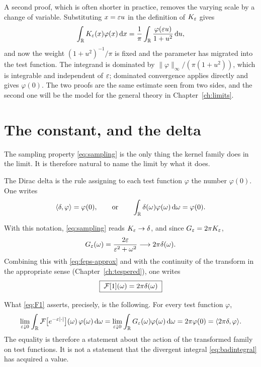 A second proof, which is often shorter in practice, removes the varying scale by a change of
variable. Substituting $x=\varepsilon u$ in the definition of $K_{\varepsilon}$ gives
\begin{equation}
\int_{\mathbb{R}}K_{\varepsilon}(x)\varphi(x)\,\mathrm{d} x
=\frac{1}{\pi}\int_{\mathbb{R}}\frac{\varphi(\varepsilon u)}{1+u^{2}}\,\mathrm{d} u ,
\label{eq:substitution-proof}
\end{equation}
and now the weight $(1+u^{2})^{-1}/\pi$ is fixed and the parameter has migrated into the test
function. The integrand is dominated by $\|\varphi\|_{\infty}/(\pi(1+u^{2}))$, which is integrable
and independent of $\varepsilon$; dominated convergence applies directly and gives $\varphi(0)$. The two
proofs are the same estimate seen from two sides, and the second one will be the model for the
general theory in Chapter~\ref{ch:limits}.

\section{The constant, and the delta}

The sampling property \eqref{eq:sampling} is the only thing the kernel family does in the limit.
It is therefore natural to name the limit by what it does.

\begin{definition}\label{def:delta}
The Dirac delta is the rule assigning to each test function $\varphi$ the number $\varphi(0)$. One
writes
\begin{equation}
\langle \delta,\varphi\rangle=\varphi(0),
\qquad\text{or}\qquad
\int_{\mathbb{R}}\delta(\omega)\varphi(\omega)\,\mathrm{d}\omega=\varphi(0).
\label{eq:deltadef}
\end{equation}
\end{definition}

With this notation, \eqref{eq:sampling} reads $K_{\varepsilon}\to\delta$, and since $G_{\varepsilon}=2\pi K_{\varepsilon}$,
\begin{equation}
G_{\varepsilon}(\omega)=\frac{2\varepsilon}{\varepsilon^{2}+\omega^{2}}\longrightarrow 2\pi\delta(\omega).
\end{equation}
Combining this with \eqref{eq:feps-approx} and with the continuity of the transform in the
appropriate sense (Chapter~\ref{ch:tespered}), one writes
\begin{equation}
\boxed{\;\mathcal{F}[1](\omega)=2\pi\delta(\omega)\;}
\label{eq:F1}
\end{equation}

What \eqref{eq:F1} asserts, precisely, is the following. For every test function $\varphi$,
\begin{equation}
\lim_{\varepsilon\downarrow0}\int_{\mathbb{R}}\mathcal{F}\big[e^{-\varepsilon|\cdot|}\big](\omega)\,\varphi(\omega)\,\mathrm{d}\omega
=\lim_{\varepsilon\downarrow0}\int_{\mathbb{R}}G_{\varepsilon}(\omega)\varphi(\omega)\,\mathrm{d}\omega
=2\pi\varphi(0)
=\langle 2\pi\delta,\varphi\rangle.
\end{equation}
The equality is therefore a statement about the action of the transformed family on test
functions. It is not a statement that the divergent integral \eqref{eq:badintegral} has acquired a
value.

